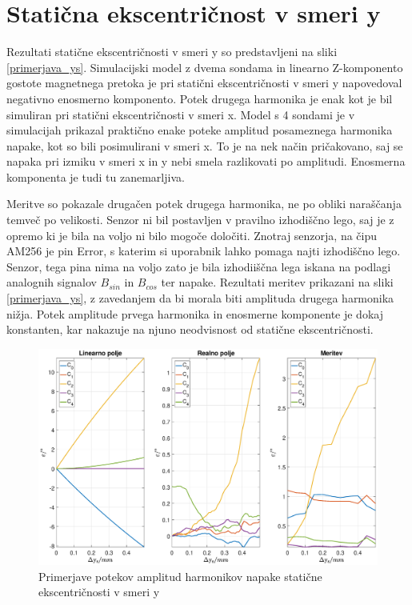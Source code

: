 \section{Statična ekscentričnost v smeri y}
Rezultati statične ekscentričnosti v smeri y so predstavljeni na sliki \ref{primerjava_ys}. Simulacijski model z dvema sondama in linearno Z-komponento gostote magnetnega pretoka je pri statični ekscentričnosti v smeri y napovedoval negativno enosmerno komponento. Potek drugega harmonika je enak kot je bil simuliran pri statični ekscentričnosti v smeri x. Model s 4 sondami je v simulacijah prikazal praktično enake poteke amplitud posameznega harmonika napake, kot so bili posimulirani v smeri x. To je na nek način pričakovano, saj se napaka pri izmiku v smeri x in y nebi smela razlikovati po amplitudi. Enosmerna komponenta je tudi tu zanemarljiva.

Meritve so pokazale drugačen potek drugega harmonika, ne po obliki naraščanja temveč po velikosti. Senzor ni bil postavljen v pravilno izhodiščno lego, saj je z opremo ki je bila na voljo ni bilo mogoče določiti. Znotraj senzorja, na čipu AM256 je pin Error, s katerim si uporabnik lahko pomaga najti izhodiščno lego. Senzor, tega pina nima na voljo zato je bila izhodiiščna lega iskana na podlagi analognih signalov $B_{sin}$ in $B_{cos}$ ter napake. Rezultati meritev prikazani na sliki \ref{primerjava_ys}, z zavedanjem da bi morala biti amplituda drugega harmonika nižja. Potek amplitude prvega harmonika in enosmerne komponente je dokaj konstanten, kar nakazuje na njuno neodvisnost od statične ekscentričnosti. 
\begin{figure}[ht]

	\centering
	\includegraphics[width=\columnwidth]{./Slike/primerjava_ys.eps}
	\caption{Primerjave potekov amplitud harmonikov napake  statične ekscentričnosti v smeri y}
	\label{primerjava_xs}
\end{figure}

